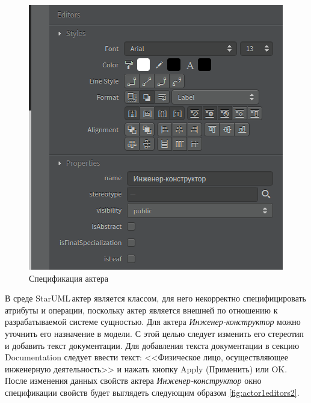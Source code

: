 \documentclass[a4paper,12pt]{report}
\newcommand{\staruml}{StarUML\,\tm}
\begin{document}
\newpage
\begin{figure}[htbp]
	\centering
	\includegraphics[width=0.5\linewidth]{images/actor1editors}
	\caption{Спецификация актера}
	\label{fig:actor1editors}
\end{figure}

В среде \staruml актер является классом, для него некорректно специфицировать атрибуты и операции, поскольку актер является внешней по отношению к разрабатываемой системе сущностью.
Для актера \textit{Инженер-конструктор} можно уточнить его назначение в модели. С этой целью следует изменить его стереотип и добавить текст документации. Для добавления текста документации в секцию Documentation следует ввести текст: <<Физическое лицо, осуществляющее инженерную деятельность>> и нажать кнопку Apply (Применить) или OK. После изменения данных свойств актера \textit{Инженер-конструктор} окно спецификации свойств будет выглядеть следующим образом \ref{fig:actor1editors2}.
\end{document}
